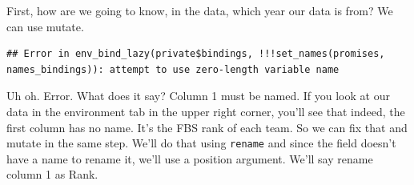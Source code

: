 \documentclass[
]{book}
\newenvironment{Shaded}{\begin{snugshade}}{\end{snugshade}}
\newcommand{\DataTypeTok}[1]{\textcolor[rgb]{0.13,0.29,0.53}{#1}}
\newcommand{\DecValTok}[1]{\textcolor[rgb]{0.00,0.00,0.81}{#1}}
\newcommand{\KeywordTok}[1]{\textcolor[rgb]{0.13,0.29,0.53}{\textbf{#1}}}
\newcommand{\NormalTok}[1]{#1}
\newcommand{\OperatorTok}[1]{\textcolor[rgb]{0.81,0.36,0.00}{\textbf{#1}}}
\newcommand{\StringTok}[1]{\textcolor[rgb]{0.31,0.60,0.02}{#1}}
\begin{document}
\begin{Shaded}
\end{Shaded}

First, how are we going to know, in the data, which year our data is from? We can use mutate.

\begin{Shaded}
\end{Shaded}

\begin{verbatim}
## Error in env_bind_lazy(private$bindings, !!!set_names(promises, names_bindings)): attempt to use zero-length variable name
\end{verbatim}

Uh oh. Error. What does it say? Column 1 must be named. If you look at our data in the environment tab in the upper right corner, you'll see that indeed, the first column has no name. It's the FBS rank of each team. So we can fix that and mutate in the same step. We'll do that using \texttt{rename} and since the field doesn't have a name to rename it, we'll use a position argument. We'll say rename column 1 as Rank.

\begin{Shaded}
\end{Shaded}
\end{document}
